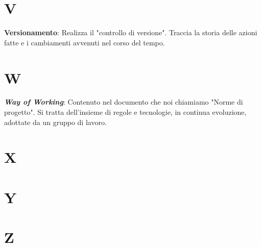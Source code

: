 \documentclass[5pt]{article}
\begin{document}
\pagebreak

\section*{V}
\begin{flushleft}
	
\textbf{Versionamento}: Realizza il "controllo di versione". Traccia la storia delle azioni fatte e i cambiamenti avvenuti nel corso del tempo.\newline
	
\end{flushleft}

\pagebreak

\section*{W}
\begin{flushleft}

\textbf{\textit{Way of Working}}: Contenuto nel documento che noi chiamiamo "Norme di progetto". Si tratta dell'insieme di regole e tecnologie, in continua evoluzione, adottate da un gruppo di lavoro.\newline

\end{flushleft}

\pagebreak

\section*{X}
\begin{flushleft}
	
\end{flushleft}

\pagebreak

\section*{Y}
\begin{flushleft}
	
\end{flushleft}

\pagebreak

\section*{Z}
\begin{flushleft}
	
\end{flushleft}

\pagebreak
\end{document}
